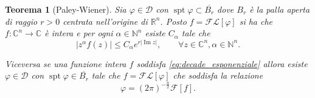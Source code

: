 \documentclass[italian,a4paper,oneside,headinclude]{scrbook}
\renewcommand{\phi}{\varphi}
\newcommand{\D}{\mathcal D}
\newcommand{\F}{\mathcal F}
\newcommand{\FL}{\mathcal F\!\mathcal L}
\newcommand{\CC}{\mathbb C}
\newcommand{\NN}{\mathbb N}
\newcommand{\RR}{\mathbb R}
\newcommand{\abs}[1]{{\left|#1\right|}}
\DeclareMathOperator{\spt}{spt}
\DeclareMathOperator{\Imaginarypart}{Im}
\renewcommand{\Im}{\Imaginarypart}
\newtheorem{theorem}{Teorema}
\begin{document}
\begin{theorem}[Paley-Wiener]\label{th:PW}
  Sia $\phi\in\D$ con $\spt \phi \subset \overline{B_r}$
  dove $B_r$ è la palla aperta
  di raggio $r>0$ centrata nell'origine di $\RR^n$.
  Posto $f = \FL[\phi]$
  si ha che $f\colon \CC^n\to \CC$ è intera
  e per ogni $\alpha \in \NN^n$
  esiste $C_\alpha$
  tale che
  \begin{equation}\label{eq:decade_esponenziale}
  \abs{z^\alpha f(z)} \le C_\alpha e^{r \abs{\Im z}},
  \qquad \forall z\in \CC^n, \alpha \in \NN^n.
  \end{equation}

  Viceversa se una funzione intera $f$ soddisfa
  \eqref{eq:decade_esponenziale} allora esiste $\phi\in\D$
  con $\spt  \phi \in \overline{B_r}$ tale che $f=\FL[\phi]$
  che soddisfa la relazione
  \[
  \phi =   (2\pi)^{-\frac n 2} \F[f].
  \]
\end{theorem}
%
\end{document}
